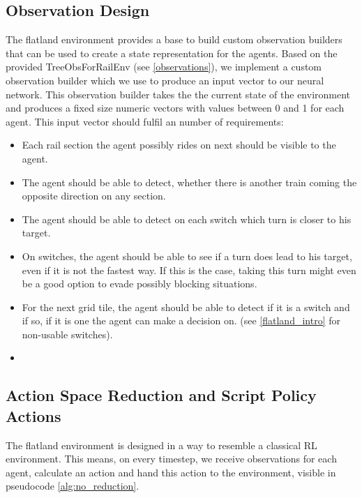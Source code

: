 \subsection*{Observation Design}\label{enhanced_observations}
The flatland environment provides a base to build custom observation builders that can be used to create a state representation for the agents. Based on the provided TreeObsForRailEnv (see \autoref{observations}), we implement a custom observation builder which we use to produce an input vector to our neural network. This observation builder takes the the current state of the environment and produces a fixed size numeric vectors with values between 0 and 1 for each agent. This input vector should fulfil an number of requirements:
\begin{itemize}
	\item Each rail section the agent possibly rides on next should be visible to the agent.
	\item The agent should be able to detect, whether there is another train coming the opposite direction on any section.
	\item The agent should be able to detect on each switch which turn is closer to his target.
	\item On switches, the agent should be able to see if a turn does lead to his target, even if it is not the fastest way. If this is the case, taking this turn might even be a good option to evade possibly blocking situations.
	\item For the next grid tile, the agent should be able to detect if it is a switch and if so, if it is one the agent can make a decision on. (see \autoref{flatland_intro} for non-usable switches).
	\item 
\end{itemize}


\subsection*{Action Space Reduction and Script Policy Actions}\label{reduced_action_space}
The flatland environment is designed in a way to resemble a classical RL environment. This means, on every timestep, we receive observations for each agent, calculate an action and hand this action to the environment, visible in pseudocode \autoref{alg:no_reduction}. 


